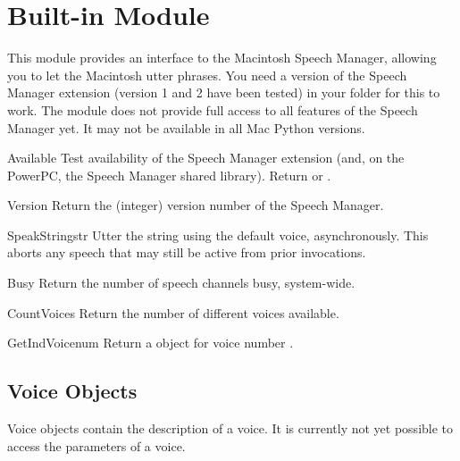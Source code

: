 \section{Built-in Module }
\label{module-macspeech}


This module provides an interface to the Macintosh Speech Manager,
allowing you to let the Macintosh utter phrases. You need a version of
the Speech Manager extension (version 1 and 2 have been tested) in
your  folder for this to work. The module does not
provide full access to all features of the Speech Manager yet.  It may
not be available in all Mac Python versions.

\begin{funcdesc}{Available}{}
Test availability of the Speech Manager extension (and, on the
PowerPC, the Speech Manager shared library). Return  or
.
\end{funcdesc}

\begin{funcdesc}{Version}{}
Return the (integer) version number of the Speech Manager.
\end{funcdesc}

\begin{funcdesc}{SpeakString}{str}
Utter the string  using the default voice,
asynchronously. This aborts any speech that may still be active from
prior  invocations.
\end{funcdesc}

\begin{funcdesc}{Busy}{}
Return the number of speech channels busy, system-wide.
\end{funcdesc}

\begin{funcdesc}{CountVoices}{}
Return the number of different voices available.
\end{funcdesc}

\begin{funcdesc}{GetIndVoice}{num}
Return a  object for voice number .
\end{funcdesc}

\subsection{Voice Objects}
\label{voice-objects}

Voice objects contain the description of a voice. It is currently not
yet possible to access the parameters of a voice.


